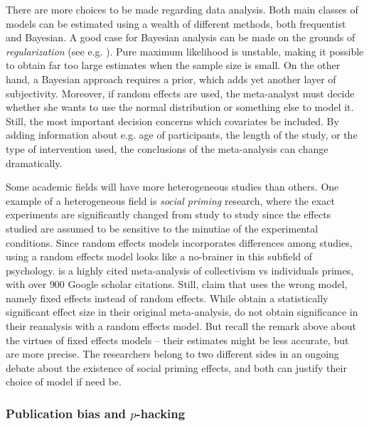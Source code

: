 There are more choices to be made regarding data analysis. Both main
classes of models can be estimated using a wealth of different methods,
both frequentist and Bayesian. A good case for Bayesian analysis can
be made on the grounds of \emph{regularization} (see e.g. \cite{simpson_penalising_2017}).
Pure maximum likelihood is unstable, making it possible to obtain
far too large estimates when the sample size is small. On the other
hand, a Bayesian approach requires a prior, which adds yet another
layer of subjectivity. Moreover, if random effects are used, the meta-analyst
must decide whether she wants to use the normal distribution or something
else to model it. Still, the most important decision concerns which
covariates be included. By adding information about e.g. age of participants,
the length of the study, or the type of intervention used, the conclusions
of the meta-analysis can change dramatically.

Some academic fields will have more heterogeneous studies than others.
One example of a heterogeneous field is \emph{social priming} research,
where the exact experiments are significantly changed from study to
study since the effects studied are assumed to be sensitive to the
minutiae of the experimental conditions. Since random effects models
incorporates differences among studies, using a random effects model
looks like a no-brainer in this subfield of psychology. \cite{oyserman_does_2008}
is a highly cited meta-analysis of collectivism vs individuals primes,
with over $900$ Google scholar citations. Still, \cite{lakens_reproducibility_2016}
claim that \cite{oyserman_does_2008} uses the wrong model, namely
fixed effects instead of random effects. While \citeauthor{oyserman_does_2008}
obtain a statistically significant effect size in their original meta-analysis,
\cite{lakens_reproducibility_2016} do not obtain significance in
their reanalysis with a random effects model. But recall the remark
above about the virtues of fixed effects models -- their estimates
might be less accurate, but are more precise. The researchers belong
to two different sides in an ongoing debate about the existence of
social priming effects, and both can justify their choice of model
if need be.

\subsubsection{Publication bias and $p$-hacking}

